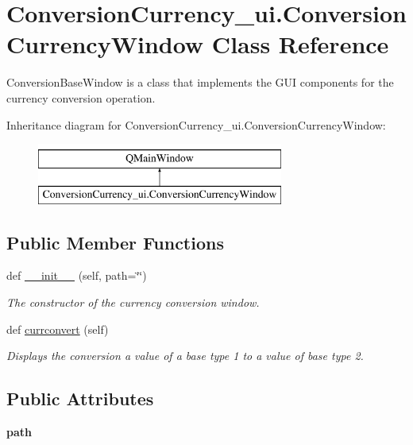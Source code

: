 \hypertarget{class_conversion_currency__ui_1_1_conversion_currency_window}{}\section{Conversion\+Currency\+\_\+ui.\+Conversion\+Currency\+Window Class Reference}
\label{class_conversion_currency__ui_1_1_conversion_currency_window}


Conversion\+Base\+Window is a class that implements the G\+UI components for the currency conversion operation.  


Inheritance diagram for Conversion\+Currency\+\_\+ui.\+Conversion\+Currency\+Window\+:\begin{figure}[H]
\begin{center}
\leavevmode
\includegraphics[height=2.000000cm]{class_conversion_currency__ui_1_1_conversion_currency_window}
\end{center}
\end{figure}
\subsection*{Public Member Functions}
\begin{DoxyCompactItemize}
\item 
def \hyperlink{class_conversion_currency__ui_1_1_conversion_currency_window_a5219de9caa768775d8a5c638bb20cd17}{\+\_\+\+\_\+init\+\_\+\+\_\+} (self, path=\char`\"{}\char`\"{})
\begin{DoxyCompactList}\small\item\em The constructor of the currency conversion window. \end{DoxyCompactList}\item 
def \hyperlink{class_conversion_currency__ui_1_1_conversion_currency_window_ad8504b8dbbe0d321f4c2374e17c92fcf}{currconvert} (self)
\begin{DoxyCompactList}\small\item\em Displays the conversion a value of a base type 1 to a value of base type 2. \end{DoxyCompactList}\end{DoxyCompactItemize}
\subsection*{Public Attributes}
\begin{DoxyCompactItemize}
\item 
\mbox{\label{class_conversion_currency__ui_1_1_conversion_currency_window_af9c27d4f866095863b98223f4687dfae}} 
{\bfseries path}
\end{DoxyCompactItemize}


